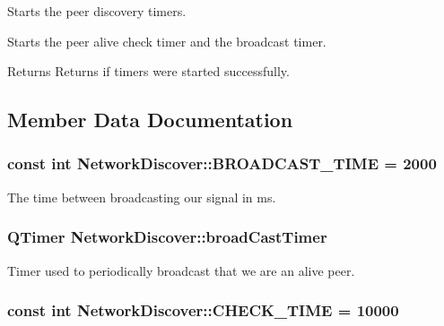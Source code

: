 \-Starts the peer discovery timers. 

\-Starts the peer alive check timer and the broadcast timer. \begin{DoxyReturn}{\-Returns}
\-Returns if timers were started successfully. 
\end{DoxyReturn}


\subsection{\-Member \-Data \-Documentation}
\hypertarget{class_network_discover_ac85620fa17d1128dc86745611df1dbe0}{
\subsubsection[{\-B\-R\-O\-A\-D\-C\-A\-S\-T\-\_\-\-T\-I\-M\-E}]{\setlength{\rightskip}{0pt plus 5cm}const int {\bf \-Network\-Discover\-::\-B\-R\-O\-A\-D\-C\-A\-S\-T\-\_\-\-T\-I\-M\-E} = 2000}}
\label{class_network_discover_ac85620fa17d1128dc86745611df1dbe0}


\-The time between broadcasting our signal in ms. 

\hypertarget{class_network_discover_a82d0981a5c6c1acecd85a0e210b631f2}{
\subsubsection[{broad\-Cast\-Timer}]{\setlength{\rightskip}{0pt plus 5cm}\-Q\-Timer {\bf \-Network\-Discover\-::broad\-Cast\-Timer}}}
\label{class_network_discover_a82d0981a5c6c1acecd85a0e210b631f2}


\-Timer used to periodically broadcast that we are an alive peer. 

\hypertarget{class_network_discover_afc4903f686b81fff1247fc7cbcea17ff}{
\subsubsection[{\-C\-H\-E\-C\-K\-\_\-\-T\-I\-M\-E}]{\setlength{\rightskip}{0pt plus 5cm}const int {\bf \-Network\-Discover\-::\-C\-H\-E\-C\-K\-\_\-\-T\-I\-M\-E} = 10000}}
\label{class_network_discover_afc4903f686b81fff1247fc7cbcea17ff}


